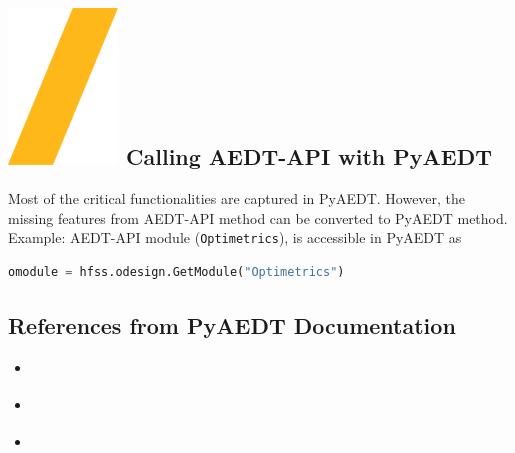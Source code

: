 \documentclass[9pt,landscape]{article}
\begin{document}
\begin{multicols}{3}
\section{\includegraphics[height=\fontcharht\font`\S]{slash.png} Calling AEDT-API with PyAEDT}
Most of the critical functionalities are captured in PyAEDT. However, the missing features from AEDT-API method can be converted to PyAEDT method.
\newline
\\
Example: AEDT-API module (\texttt{Optimetrics}), is accessible in PyAEDT as
\begin{lstlisting}[language=Python]
omodule = hfss.odesign.GetModule("Optimetrics")
\end{lstlisting}

\subsection{References from PyAEDT Documentation}
\begin{itemize}
\item \href{https://aedt.docs.pyansys.com/version/stable/Getting_started/index.html}{\color{blue}{Getting Started}}
\item \href{https://aedt.docs.pyansys.com/version/stable/User_guide/index.html}{\color{blue}{User Guide}}
\item \href{https://aedt.docs.pyansys.com/version/stable/API/index.html}{\color{blue}{API Reference}}
\end{itemize}
\end{multicols}
\vspace{-0.15cm}
\noindent\makebox[\linewidth]{\rule{\paperwidth}{4pt}}
\end{document}
